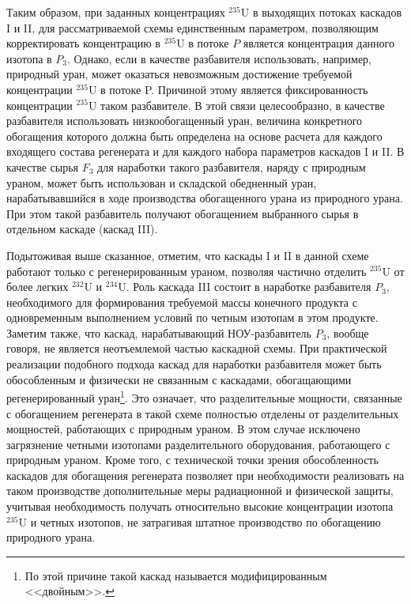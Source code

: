 Таким образом, при заданных концентрациях $^{235}$U в выходящих потоках каскадов I и II, для рассматриваемой схемы единственным параметром, позволяющим корректировать концентрацию в $^{235}$U в потоке $P$ является концентрация данного изотопа в $P_{3}$. Однако, если в качестве разбавителя использовать, например, природный уран, может оказаться невозможным достижение требуемой концентрации $^{235}$U в потоке P. Причиной этому является фиксированность концентрации $^{235}$U таком разбавителе. В этой связи целесообразно, в качестве разбавителя использовать низкообогащенный уран, величина конкретного обогащения которого должна быть определена на основе расчета для каждого входящего состава регенерата и для каждого набора параметров каскадов I и II. В качестве сырья $F_3$ для наработки такого разбавителя, наряду с природным ураном, может быть использован и складской обедненный уран, нарабатывавшийся в ходе производства обогащенного урана из природного урана. При этом такой разбавитель получают обогащением выбранного сырья в отдельном каскаде (каскад III).

Подытоживая выше сказанное, отметим, что каскады I и II в данной схеме работают только с регенерированным ураном, позволяя частично отделить $^{235}$U от более легких $^{232}$U и $^{234}$U. Роль каскада III состоит в наработке разбавителя $P_{3}$, необходимого для формирования требуемой массы конечного продукта с одновременным выполнением условий по четным изотопам в этом продукте. Заметим также, что каскад, нарабатывающий НОУ-разбавитель $P_{3}$, вообще говоря, не является неотъемлемой частью каскадной схемы. При практической реализации подобного подхода каскад для наработки разбавителя может быть обособленным и физически не связанным с каскадами, обогащающими регенерированный уран\footnote{По этой причине такой каскад называется модифицированным <<двойным>>.}. Это означает, что разделительные мощности, связанные с обогащением регенерата в такой схеме полностью отделены от разделительных мощностей, работающих с природным ураном. В этом случае исключено загрязнение четными изотопами разделительного оборудования, работающего с природным ураном. Кроме того, с технической точки зрения обособленность каскадов для обогащения регенерата позволяет при необходимости реализовать на таком производстве дополнительные меры радиационной и физической защиты, учитывая необходимость получать относительно высокие концентрации изотопа $^{235}$U и четных изотопов, не затрагивая штатное производство по обогащению природного урана.

